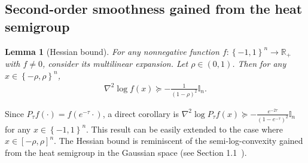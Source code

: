 \documentclass[11pt]{article}
\theoremstyle{named}
\theoremstyle{plain}
\newtheorem{lemma}{Lemma}
\newcommand{\real}{\ensuremath{\mathbb{R}}}
\newcommand{\Ind}{\ensuremath{\mathbb{I}}}
\newcommand{\braces}[1]{\left\{ #1 \right \}}
\begin{document}
\subsection{Second-order smoothness gained from the heat semigroup}
\begin{lemma}[Hessian bound]
  \label{lem:hessian_smoothness}
  For any nonnegative function $f: \braces{-1,1}^n \to \real_+$ with $f\neq 0$, consider its multilinear expansion. Let $\rho \in (0, 1)$. Then for any $x \in \braces{-\rho, \rho}^n$,
  \begin{align*}
    \nabla^2 \log f(x) \succeq -\frac{1}{(1-\rho)^2} \Ind_n.
  \end{align*}
\end{lemma}
Since $P_\tau f (\cdot) = f(e^{-\tau} \cdot)$, a direct corollary is $\nabla^2 \log P_\tau f(x) \succeq -\frac{e^{-2\tau}}{(1-e^{-\tau})^2} \Ind_n$ for any $x \in \braces{-1,1}^n$. This result can be easily extended to the case where $x \in [-\rho, \rho]^n$. The Hessian bound is reminiscent of the semi-log-convexity gained from the heat semigroup in the Gaussian space (see Section 1.1~\cite{eldan2018regularization}). 
\end{document}
